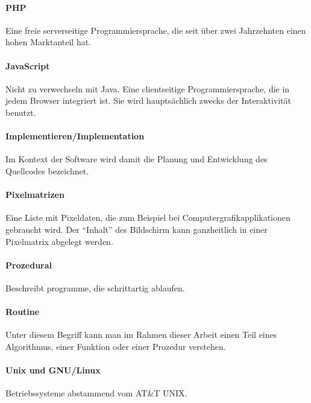 \documentclass[12pt,a4paper,german]{report}
\begin{document}
\paragraph{PHP} Eine freie serverseitige Programmiersprache, die seit über zwei Jahrzehnten einen hohen Marktanteil hat.
\paragraph{JavaScript} Nicht zu verwechseln mit Java. Eine clientseitige Programmiersprache, die in jedem Browser integriert ist. Sie wird hauptsächlich zwecks der Interaktivität benutzt. 
\paragraph{Implementieren/Implementation} Im Kontext der Software wird damit die Planung und Entwicklung des Quellcodes bezeichnet.
\paragraph{Pixelmatrizen} Eine Liste mit Pixeldaten, die zum Beispiel bei Computergrafikapplikationen gebraucht wird. Der ``Inhalt'' des Bildschirm kann ganzheitlich in einer Pixelmatrix abgelegt werden.
\paragraph{Prozedural} Beschreibt programme, die schrittartig ablaufen.
\paragraph{Routine} Unter diesem Begriff kann man im Rahmen dieser Arbeit einen Teil eines Algorithmus, einer Funktion oder einer Prozedur verstehen.
\paragraph{Unix und GNU/Linux} Betriebssysteme abstammend vom AT\&T UNIX.



\clearpage



\listoffigures
\end{document}
